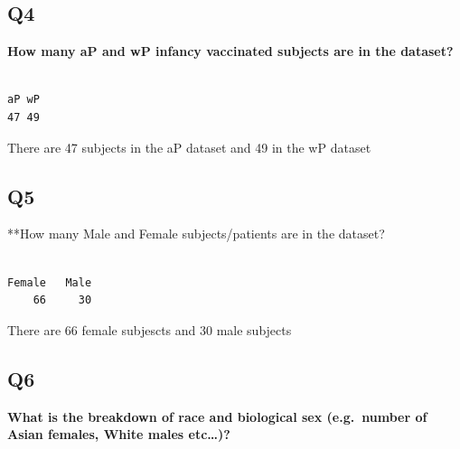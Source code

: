 \documentclass[
  letterpaper,
  DIV=11,
  numbers=noendperiod]{scrartcl}
\newenvironment{Shaded}{\begin{snugshade}}{\end{snugshade}}
\newcommand{\FunctionTok}[1]{\textcolor[rgb]{0.28,0.35,0.67}{#1}}
\newcommand{\NormalTok}[1]{\textcolor[rgb]{0.00,0.23,0.31}{#1}}
\newcommand{\SpecialCharTok}[1]{\textcolor[rgb]{0.37,0.37,0.37}{#1}}
\begin{document}
\hypertarget{q4}{%
\subsection{Q4}\label{q4}}

\textbf{How many aP and wP infancy vaccinated subjects are in the
dataset?}

\begin{Shaded}
\end{Shaded}

\begin{verbatim}

aP wP 
47 49 
\end{verbatim}

There are 47 subjects in the aP dataset and 49 in the wP dataset

\hypertarget{q5}{%
\subsection{Q5}\label{q5}}

**How many Male and Female subjects/patients are in the dataset?

\begin{Shaded}
\end{Shaded}

\begin{verbatim}

Female   Male 
    66     30 
\end{verbatim}

There are 66 female subjescts and 30 male subjects

\hypertarget{q6}{%
\subsection{Q6}\label{q6}}

\textbf{What is the breakdown of race and biological sex (e.g.~number of
Asian females, White males etc\ldots)?}

\begin{Shaded}
\end{Shaded}
\end{document}
